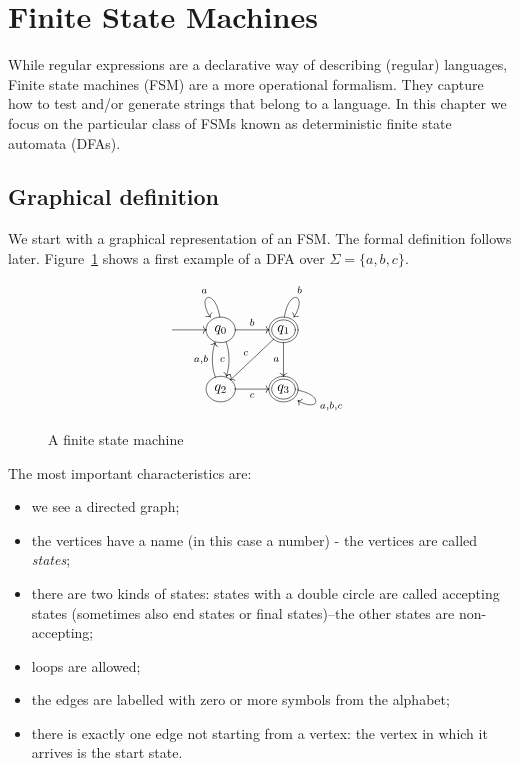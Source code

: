 \section{Finite State Machines}

While regular expressions are a declarative way of describing (regular)
languages, 
Finite state machines (FSM) are a more operational formalism. They
capture how to test and/or generate strings that belong
to a language. In this chapter we focus on the particular class 
of FSMs known as deterministic finite state automata (DFAs).

\subsection{Graphical definition}
We start with a graphical representation of an FSM. The formal definition follows
later. Figure~\ref{fsa1} shows a first example of a
DFA over $\Sigma = \{a,b,c\}$.

\begin{figure}[h]
\begin{equation*}
\atm\xymatrix{
*{} \ar[r] & q_0 \ar[r]^b\ar@(u,ul)_a\ar@/^/[d]_c & \accept{q_1}\ar@(u,ur)^{b}\ar[dl]_c\ar[d]_a \\
*{}        & q_2\ar[r]_c\ar@/^/[u]^{a,b} & \accept{q_3}\ar@(r,rd)^{a,b,c}
}
\end{equation*}
\caption{A finite state machine\label{fsa1}}
\end{figure}

The most important characteristics are:

\begin{itemize}
\item we see a directed graph;\vspace{-0.5em}

\item the vertices have a name (in this case a number) - the vertices
  are called {\em states};\vspace{-0.5em}
\item there are two kinds of states: states with a double circle are
  called accepting states (sometimes also end states or final
  states)--the other states are non-accepting;\vspace{-0.5em}
\item loops are allowed;\vspace{-0.5em}
\item the edges are labelled with zero or more symbols from the
  alphabet;\vspace{-0.5em}
\item there is exactly one edge not starting from a vertex: the vertex
  in which it arrives is the start state.
\end{itemize}

